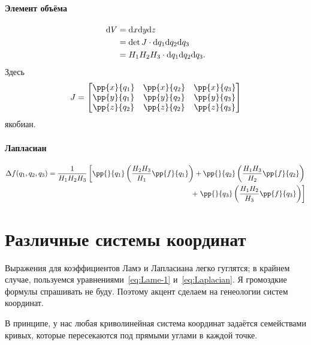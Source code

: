 \documentclass[12pt]{report}
\begin{document}
\paragraph{Элемент объёма}
\begin{align}
	\mathrm d V &= \mathrm d x\mathrm d y\mathrm d z \notag\\
	&= \det J \cdot \mathrm d q_1\mathrm d q_2\mathrm d q_3 \notag\\
	&= H_1H_2H_3\cdot \mathrm d q_1\mathrm d q_2\mathrm d q_3. \label{eq:unit-volume}
\end{align}
Здесь 
\[
J = \left[\begin{matrix}
\pp{x}{q_1} & \pp{x}{q_2} & \pp{x}{q_3} \\
\pp{y}{q_1} & \pp{y}{q_2} & \pp{y}{q_3} \\
\pp{z}{q_2} & \pp{z}{q_2} & \pp{z}{q_3}
\end{matrix}\right]
\]
якобиан.~\cite{Jacobian}

\paragraph{Лапласиан}
\newcommand{\HHH}[3]{\frac{H_{#1}H_{#2}}{H_{#3}}}
\begin{align}
	\Delta f(q_1,q_2,q_3) = \frac{1}{H_1 H_2 H_3}
	\left[
	      \pp{}{q_1}\left(\HHH{2}{3}{1}\pp{f}{q_1}\right) 
	+ \pp{}{q_2}\left(\HHH{1}{3}{2}\pp{f}{q_2}\right)\right. \notag\\
	+ \left.\pp{}{q_3}\left(\HHH{1}{2}{3}\pp{f}{q_3}\right)
	\right] \label{eq:Laplacian}
\end{align}

 \section{Различные системы координат}
 Выражения для коэффициентов Ламэ и Лапласиана легко гуглятся; в крайнем случае, пользуемся уравнениями~\eqref{eq:Lame-1} и~\eqref{eq:Laplacian}. Я громоздкие формулы спрашивать не буду. 
 Поэтому акцент сделаем на генеологии систем координат.
 
 В принципе, у нас любая криволинейная система координат задаётся семействами кривых, которые пересекаются под прямыми углами в каждой точке. 
\end{document}
